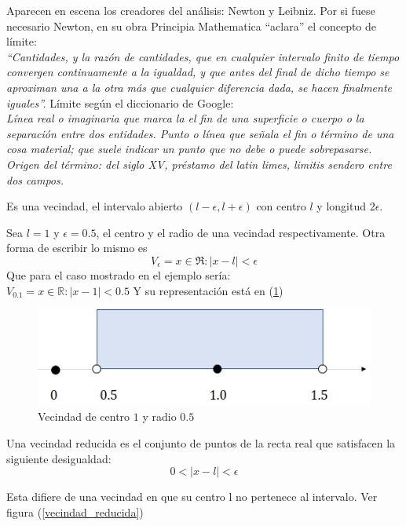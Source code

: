 \documentclass[10pt,twoside]{SelfArx} %
\begin{document}
Aparecen en escena los creadores del análisis: Newton y Leibniz.
Por si fuese necesario Newton, en su obra Principia Mathematica “aclara” el concepto de límite:\\
\textit{“Cantidades, y la razón de cantidades, que en cualquier intervalo  finito de tiempo convergen continuamente a la igualdad, y que antes del final de dicho tiempo se aproximan una a la otra más que cualquier diferencia dada, se hacen finalmente iguales”.}
Límite según el diccionario de Google:\\
\textit{
Línea real o imaginaria que marca la el fin de una superficie o cuerpo o la separación entre dos entidades.
Punto o línea que señala el fin o término de una cosa material; que suele indicar un punto que no debe o puede sobrepasarse.
Origen del término: del siglo XV, préstamo del latin limes, limitis sendero entre dos campos.}\\

\begin{thm}\label{vecindad}
Es una vecindad, el intervalo abierto $ (l-\epsilon, l+\epsilon) $ con centro $ l $ y longitud $ 2\epsilon $.
\end{thm}
\begin{ejemplo}
Sea $ l=1 $ y $ \epsilon=0.5 $, el centro y el radio de una vecindad respectivamente.
Otra forma de escribir lo mismo es 
\[ V_{\epsilon}={x\in\Re: |x-l|<\epsilon} \]
Que para el caso mostrado en el ejemplo sería:\\
$  V_{0.1}={x\in\mathbb{R}:|x-1|<0.5}  $
Y su representaci\'on est\'a en (\ref{vecindad_im1})

\end{ejemplo}
\begin{figure}[h]
\centering
\includegraphics{vecindad}
\caption{Vecindad de centro $ 1 $ y radio $ 0.5 $}
\label{vecindad_im1}
\end{figure}
\newpage



\begin{thm}\label{vecindad_reducida}
	Una vecindad reducida es el conjunto de puntos de la recta real que satisfacen la siguiente desigualdad:\\
	\[ 0<|x-l|<\epsilon\]
		 
		 
\end{thm}
	Esta difiere de una vecindad en que su centro l no pertenece al intervalo. Ver figura (\ref{vecindad_reducida})
\end{document}
